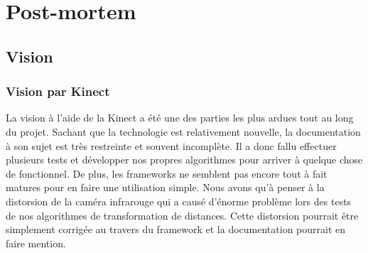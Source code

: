 

\chapter{Post-mortem}

\section{Vision}
\subsection{Vision par Kinect}
La vision à l'aide de la Kinect a été une des parties les plus ardues tout au long du projet. Sachant que la technologie est relativement nouvelle, la documentation à son sujet est très restreinte et souvent incomplète. Il a donc fallu effectuer plusieurs tests et développer nos propres algorithmes pour arriver à quelque chose de fonctionnel. De plus, les frameworks ne semblent pas encore tout à fait matures pour en faire une utilisation simple. Nous avons qu'à penser à la distorsion de la caméra infrarouge qui a causé d'énorme problème lors des tests de nos algorithmes de transformation de distances. Cette distorsion pourrait être simplement corrigée au travers du framework et la documentation pourrait en faire mention.


